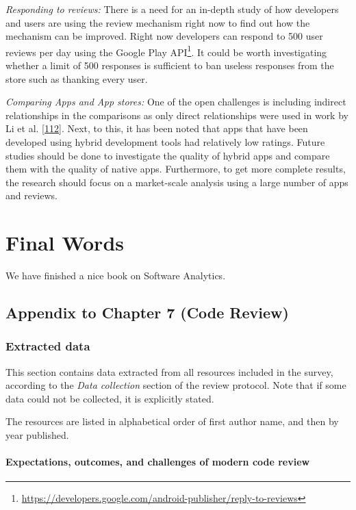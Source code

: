 \documentclass[]{book}
\let\rmarkdownfootnote\footnote%
\def\footnote{\protect\rmarkdownfootnote}
\begin{document}
\emph{Responding to reviews:} There is a need for an in-depth study of
how developers and users are using the review mechanism right now to
find out how the mechanism can be improved. Right now developers can
respond to 500 user reviews per day using the Google Play API\footnote{\url{https://developers.google.com/android-publisher/reply-to-reviews}}.
It could be worth investigating whether a limit of 500 responses is
sufficient to ban useless responses from the store such as thanking
every user.

\emph{Comparing Apps and App stores:} One of the open challenges is
including indirect relationships in the comparisons as only direct
relationships were used in work by Li et al.
{[}\protect\hyperlink{ref-li2017mining}{112}{]}. Next, to this, it has
been noted that apps that have been developed using hybrid development
tools had relatively low ratings. Future studies should be done to
investigate the quality of hybrid apps and compare them with the quality
of native apps. Furthermore, to get more complete results, the research
should focus on a market-scale analysis using a large number of apps and
reviews.

\chapter{Final Words}\label{final-words}

We have finished a nice book on Software Analytics.

\appendix


\section{Appendix to Chapter 7 (Code
Review)}\label{appendix-to-chapter-7-code-review}

\subsection{Extracted data}\label{extracted-data}

This section contains data extracted from all resources included in the
survey, according to the \emph{Data collection} section of the review
protocol. Note that if some data could not be collected, it is
explicitly stated.

The resources are listed in alphabetical order of first author name, and
then by year published.

\subsubsection{Expectations, outcomes, and challenges of modern code
review}\label{expectations-outcomes-and-challenges-of-modern-code-review}
\end{document}

